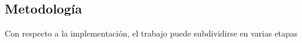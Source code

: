 \begin{intro}






 

\section*{Metodología}

Con respecto a la implementación, el trabajo puede subdividirse en varias etapas


\end{intro}
